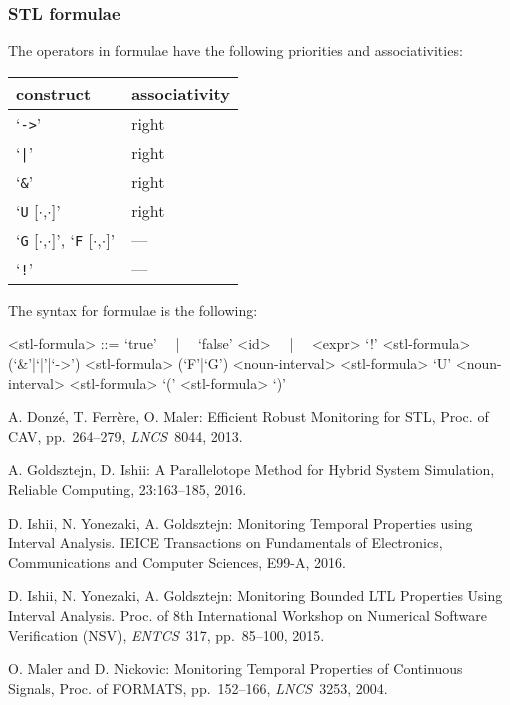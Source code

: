 \documentclass[12pt,a4paper]{article}
\newcommand{\LNCS}[1]{\textit{LNCS}~#1}
\newcommand{\ENTCS}[1]{\textit{ENTCS}~#1}
\begin{document}
\subsubsection{STL formulae}

The operators in formulae have the following priorities and associativities:
\begin{table}[ht]
	\centering
    \begin{tabular}{|l|l|} \hline
		construct & associativity \\
		\hline
		`\texttt{->}' & right \\
		`\texttt{|}' & right \\
		`\texttt{\&}' & right \\
		`\texttt{U} [$\cdot$,$\cdot$]' & right \\
		`\texttt{G} [$\cdot$,$\cdot$]', `\texttt{F} [$\cdot$,$\cdot$]' & --- \\
		`\texttt{!}' & --- \\
		\hline
	\end{tabular}
\end{table}

The syntax for formulae is the following:
\begin{grammar}
<stl-formula> ::= `true' ~~|~~ `false'
\alt <id> ~~|~~ <expr>
\alt `!' <stl-formula>
 (`&'|`|'|`->') <stl-formula>
\alt (`F'|`G') <noun-interval> <stl-formula>
 `U' <noun-interval> <stl-formula>
\alt `(' <stl-formula> `)'
\end{grammar}


\begin{thebibliography}{99}
    A. Donz\'{e}, T. Ferr\`{e}re, O. Maler: 
    {Efficient Robust Monitoring for STL},
    Proc. of CAV, pp.~264--279, \LNCS{8044}, 2013.

    A. Goldsztejn, D. Ishii: 
    {A Parallelotope Method for Hybrid System Simulation},
    Reliable Computing, 23:163--185, 2016.

    D. Ishii, N. Yonezaki, A. Goldsztejn: 
    {Monitoring Temporal Properties using Interval Analysis}. 
    IEICE Transactions on Fundamentals of Electronics, Communications and Computer Sciences,
    E99-A, 2016.

    D. Ishii, N. Yonezaki, A. Goldsztejn: 
    {Monitoring Bounded LTL Properties Using Interval Analysis}. 
    Proc. of 8th International Workshop on Numerical Software Verification (NSV), 
    \ENTCS{317}, pp.~85--100, 2015.

    O. Maler and D. Nickovic:
    Monitoring Temporal Properties of Continuous Signals,
    Proc. of FORMATS, pp.~152--166, \LNCS{3253}, 2004.
\end{thebibliography}
\end{document}
